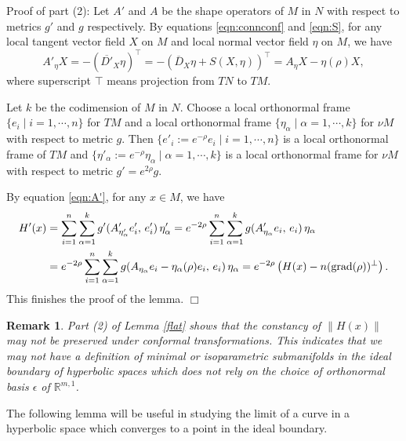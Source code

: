 \documentclass[12pt]{article}
\newtheorem{rmk}[lem]{Remark}
\begin{document}
\vspace{6pt}
\noindent
{Proof of part (2)}:
Let $A'$ and $A$ be the shape operators  of $M$ in $N$  with respect to metrics $g'$ and $g$ respectively.
By equations \eqref{eqn:connconf} and \eqref{eqn:S}, for any local tangent vector field $X$ on $M$ and local normal
vector field $\eta$ on $M$, we have
\begin{equation} \label{eqn:A'}
A'_{\eta} X
=  - (\overline{D'}_{X} \eta)^{\top}
= - \left( \overline{D}_{X} \eta + S(X, \eta) \right)^{\top}
= A_{\eta} X - \eta(\rho) X,
\end{equation}
where superscript $\top$ means projection from $TN$ to $TM$.

Let $k$ be the codimension of $M$ in $N$.
Choose a local orthonormal frame $\{e_i \mid i=1, \cdots, n\}$ for $TM$ and
a local orthonormal  frame $\{\eta_\alpha \mid \alpha=1, \cdots, k\}$ for $\nu M$
 with respect to metric $g$.
Then $\{e'_i := e^{-\rho} e_i \mid i=1, \cdots, n\}$ is a local orthonormal frame of $TM$
and $\{\eta'_\alpha := e^{-\rho}\eta_\alpha \mid \alpha=1, \cdots, k\}$ is a local  orthonormal  frame  for $\nu M$
with respect to metric $g' = e^{2\rho}g $.

By equation \eqref{eqn:A'}, for any $x\in M$, we have
\begin{align}
	H'(x)
	&=\sum_{i=1}^n \sum_{\alpha=1}^{k} g'( A'_{\eta'_{\alpha}} e'_i, \,  e'_i) \, \eta'_{\alpha}
    = e^{-2 \rho} \sum_{i=1}^n  \sum_{\alpha=1}^{k} g( A'_{\eta_{\alpha}} e_i, \,  e_i) \, \eta_{\alpha} \nonumber \\
    &= e^{-2 \rho} \sum_{i=1}^n  \sum_{\alpha=1}^{k} g( A_{\eta_{\alpha}} e_i - \eta_{\alpha} (\rho) e_i, \,  e_i)
          \, \eta_{\alpha}
    = e^{-2 \rho} \left( H(x) - n  ({\rm grad}(\rho))^\perp  \right).
     \nonumber
\end{align}
This finishes the proof of the lemma.
$\Box$

\begin{rmk}
Part (2) of Lemma \ref{flat} shows that the constancy of $\|H(x)\|$ may not be preserved under conformal transformations.
This indicates that we may not have a definition of minimal or isoparametric submanifolds in the ideal boundary of
 hyperbolic spaces which does not rely on
the choice of orthonormal basis $\epsilon$ of $\mathbb{R}^{m,1}$.
\end{rmk}

The following lemma will be useful in studying the limit of a curve in a hyperbolic space which converges to a point in the ideal boundary.
\end{document}
